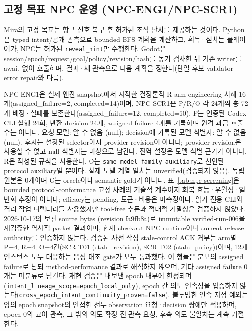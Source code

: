 \subsection{고정 목표 NPC 운영 (NPC-ENG1/NPC-SCR1)}
Mira의 고정 목표는 항구 신호 복구 후 허가된 조석 단서를 제공하는 것이다. Python은 typed intent/공개 관측으로 bounded BFS 계획을 계산하고, 획득·설치는 플레이어가, NPC는 허가된 \texttt{reveal\_hint}만 수행한다. Godot은 session/epoch/request/goal/policy/revision/hash를 동기 검사한 뒤 기존 writer를 await 없이 호출하며, 결과·새 관측으로 다음 계획을 정한다(단일 후보 validator-error repair와 다름).

NPC-ENG1은 실제 엔진 snapshot에서 시작한 결정론적 R-arm engineering 사례 16개(assigned\_failure=2, completed=14)이며, NPC-SCR1은 P/R/O 각 24개씩 총 72개 배정·실패를 보존한다(assigned\_failure=12, completed=60). P는 인증된 Codex CLI 실행 24회, 반환 decision 24개, assigned failure 4개를 기록하며 원격 과금 호출 수는 아니다. 요청 모델: 알 수 없음 (null); decision에 기록된 모델 식별자: 알 수 없음 (null). 후자는 설정된 selector이지 provider revision이 아니다; provider revision은 사용할 수 없고 null 식별자는 미상으로 남긴다. 전역 설정은 모델 식별 근거가 아니다. R은 작성된 규칙을 사용한다. O는 \texttt{same\_model\_family\_auxiliary}로 선언된 protocol auxiliary일 뿐이다. 실제 모델 계열 일치는 unverified(검증되지 않음). 독립 원본은 0개이며 O는 oracle이나 semantic gold가 아니다. 표~\ref{tab:npc-screening}은 bounded protocol-conformance 고정 사례의 기술적 계수이지 회복 효능·우월성·일반화 추정이 아니다; efficacy는 pending, 토큰·비용은 미측정이다. 읽기 전용 CLI와 격리 작업 디렉터리를 사용했지만 tool-free 추론과 적대적 기밀성은 검증하지 않았다.
2026-10-17의 보관 source bytes (revision fa9fb8a)로 immutable verified-run-006을 재검증한 역사적 packet 결과이며, 현재 checkout NPC runtime이나 current release authority를 인증하지 않는다.
검증된 사전 작성 stale-control ACK 거부는 arm별 P=4, R=4, O=4건(SCR-T01 (stale\_revision), SCR-T02 (stale\_policy))이며, 12개 인스턴스 모두 대응하는 음성 대조 gate가 모두 통과했다. 이 행들은 분모의 assigned failure로 남되 method-performance 결과로 해석하지 않으며, 기타 assigned failure 0개는 미분류로 남긴다.
재현 검증은 내보낸 epoch 내부에 한정되며(\texttt{intent\_lineage\_scope=epoch\_local\_only}), epoch 간 의도 연속성을 입증하지 않는다(\texttt{\small cross\_epoch\_intent\_continuity\_proven=false}). 불투명한 연속 지점 예외는 양의 epoch snapshot의 인접한 선두 observation 요청·decision 쌍에만 적용하며, epoch 0의 고아 관측, 그 밖의 의도 확정 전 관측 요청, 후속 의도 불일치는 계속 거절한다.
